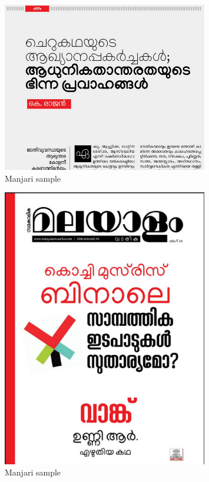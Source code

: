 \documentclass[11pt,twoside,a4paper]{article}
\begin{document}
\begin{figure}[h!]
	\includegraphics[width=0.8\textwidth]{images/manjari-sample-2.png}
	\caption{Manjari sample}
	\label{manjari-sample-2}
\end{figure}

\begin{figure}[h!]
	\includegraphics[width=0.8\textwidth]{images/manjari-sample-3.png}
	\caption{Manjari sample}
	\label{manjari-sample-3}
\end{figure}
\end{document}
